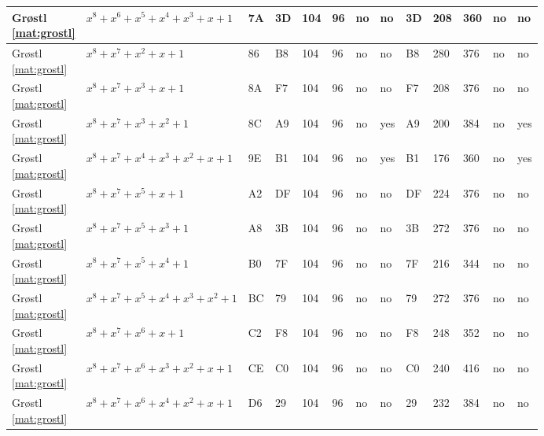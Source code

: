 \begin{tiny}
\begin{longtable}{|l|l|l|l|l|l|l|l|l|l|l|l|l|}
\shortstack{Gr{\o}stl \\ \eqref{mat:grostl}} & $x^8 + x^6 + x^5 + x^4 + x^3 + x + 1$ & 7A & 3D & 104 & 96 & no & no & 3D & 208 & 360 & no & no \\ \hline
\shortstack{Gr{\o}stl \\ \eqref{mat:grostl}} & $x^8 + x^7 + x^2 + x + 1$ & 86 & B8 & 104 & 96 & no & no & B8 & 280 & 376 & no & no \\ \hline
\shortstack{Gr{\o}stl \\ \eqref{mat:grostl}} & $x^8 + x^7 + x^3 + x + 1$ & 8A & F7 & 104 & 96 & no & no & F7 & 208 & 376 & no & no \\ \hline
\shortstack{Gr{\o}stl \\ \eqref{mat:grostl}} & $x^8 + x^7 + x^3 + x^2 + 1$ & 8C & A9 & 104 & 96 & no & yes & A9 & 200 & 384 & no & yes \\ \hline
\shortstack{Gr{\o}stl \\ \eqref{mat:grostl}} & $x^8 + x^7 + x^4 + x^3 + x^2 + x + 1$ & 9E & B1 & 104 & 96 & no & yes & B1 & 176 & 360 & no & yes \\ \hline
\shortstack{Gr{\o}stl \\ \eqref{mat:grostl}} & $x^8 + x^7 + x^5 + x + 1$ & A2 & DF & 104 & 96 & no & no & DF & 224 & 376 & no & no \\ \hline
\shortstack{Gr{\o}stl \\ \eqref{mat:grostl}} & $x^8 + x^7 + x^5 + x^3 + 1$ & A8 & 3B & 104 & 96 & no & no & 3B & 272 & 376 & no & no \\ \hline
\shortstack{Gr{\o}stl \\ \eqref{mat:grostl}} & $x^8 + x^7 + x^5 + x^4 + 1$ & B0 & 7F & 104 & 96 & no & no & 7F & 216 & 344 & no & no \\ \hline
\shortstack{Gr{\o}stl \\ \eqref{mat:grostl}} & $x^8 + x^7 + x^5 + x^4 + x^3 + x^2 + 1$ & BC & 79 & 104 & 96 & no & no & 79 & 272 & 376 & no & no \\ \hline
\shortstack{Gr{\o}stl \\ \eqref{mat:grostl}} & $x^8 + x^7 + x^6 + x + 1$ & C2 & F8 & 104 & 96 & no & no & F8 & 248 & 352 & no & no \\ \hline
\shortstack{Gr{\o}stl \\ \eqref{mat:grostl}} & $x^8 + x^7 + x^6 + x^3 + x^2 + x + 1$ & CE & C0 & 104 & 96 & no & no & C0 & 240 & 416 & no & no \\ \hline
\shortstack{Gr{\o}stl \\ \eqref{mat:grostl}} & $x^8 + x^7 + x^6 + x^4 + x^2 + x + 1$ & D6 & 29 & 104 & 96 & no & no & 29 & 232 & 384 & no & no \\ \hline

\end{longtable}
\end{tiny}
